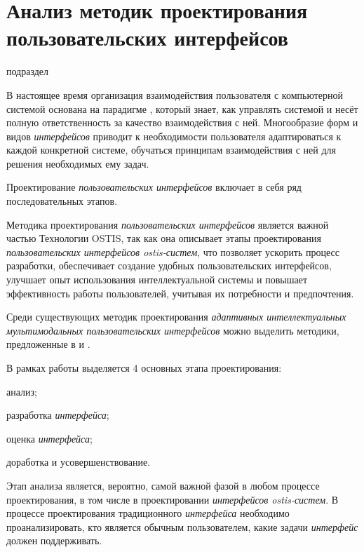 \section{Анализ методик проектирования пользовательских интерфейсов}
\label{sec_analysis_UI_design_methodologies}

\begin{SCn}
	\begin{scnrelfromlist}{подраздел}
	\end{scnrelfromlist}
\end{SCn}

В настоящее время организация взаимодействия пользователя с компьютерной системой основана на парадигме , который знает, как управлять системой и несёт полную ответственность за качество взаимодействия с ней.
Многообразие форм и видов \textit{интерфейсов} приводит к необходимости пользователя  адаптироваться к каждой конкретной системе, обучаться принципам взаимодействия с ней для решения необходимых ему задач.

Проектирование \textit{пользовательских интерфейсов} включает в себя ряд последовательных этапов.

Методика проектирования \textit{пользовательских интерфейсов} является важной частью Технологии OSTIS, так как она описывает этапы проектирования \textit{пользовательских интерфейсов ostis-систем}, что позволяет ускорить процесс разработки, обеспечивает создание удобных пользовательских интерфейсов, улучшает опыт использования интеллектуальной системы и повышает эффективность работы пользователей, учитывая их потребности и предпочтения.

Среди существующих методик проектирования \textit{адаптивных интеллектуальных мультимодальных пользовательских интерфейсов} можно выделить методики, предложенные в  и  .

В рамках работы  выделяется 4 основных этапа проектирования:
\begin{textitemize}
    \item анализ;
    \item разработка \textit{интерфейса};
    \item оценка \textit{интерфейса};
    \item доработка и усовершенствование.
\end{textitemize}

Этап анализа является, вероятно, самой важной фазой в любом процессе проектирования, в том числе в проектировании \textit{интерфейсов ostis-систем}. В процессе проектирования традиционного \textit{интерфейса} необходимо проанализировать, кто является обычным пользователем, какие задачи \textit{интерфейс} должен поддерживать. 

